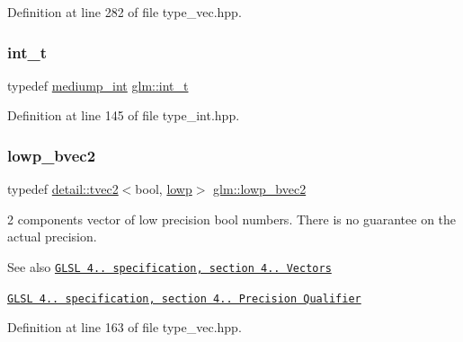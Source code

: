 Definition at line 282 of file type\+\_\+vec.\+hpp.

\mbox{\label{group__core__precision_gacd01d170508f812968875b0f2e730e8c}} 
\subsubsection{\texorpdfstring{int\+\_\+t}{int\_t}}
{\footnotesize\ttfamily typedef \hyperlink{group__core__precision_ga2a3dcbcd7f4e17663d393a12061ac6ac}{mediump\+\_\+int} \hyperlink{group__core__precision_gacd01d170508f812968875b0f2e730e8c}{glm\+::int\+\_\+t}}



Definition at line 145 of file type\+\_\+int.\+hpp.

\mbox{\label{group__core__precision_ga8ff6222d4bb4245106dab0727c8e8a45}} 
\subsubsection{\texorpdfstring{lowp\+\_\+bvec2}{lowp\_bvec2}}
{\footnotesize\ttfamily typedef \hyperlink{structglm_1_1detail_1_1tvec2}{detail\+::tvec2}$<$bool, \hyperlink{namespaceglm_a0f04f086094c747d227af4425893f545ae161af3fc695e696ce3bf69f7332bc2d}{lowp}$>$ \hyperlink{group__core__precision_ga8ff6222d4bb4245106dab0727c8e8a45}{glm\+::lowp\+\_\+bvec2}}

2 components vector of low precision bool numbers. There is no guarantee on the actual precision.

\begin{DoxySeeAlso}{See also}
\href{http://www.opengl.org/registry/doc/GLSLangSpec.4.20.8.pdf}{\tt G\+L\+SL 4.. specification, section 4.. Vectors} 

\href{http://www.opengl.org/registry/doc/GLSLangSpec.4.20.8.pdf}{\tt G\+L\+SL 4.. specification, section 4.. Precision Qualifier} 
\end{DoxySeeAlso}


Definition at line 163 of file type\+\_\+vec.\+hpp.

\mbox{\label{group__core__precision_ga17ac2986f7b315a2ac4ee2662b5be9cb}} 
